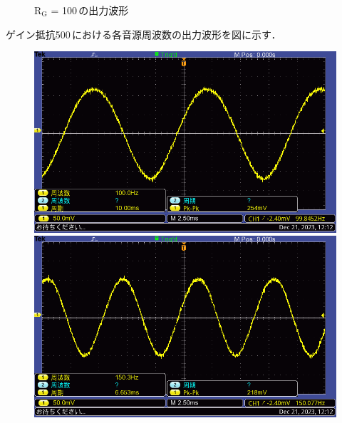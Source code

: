\documentclass{ltjsarticle}
\begin{document}
\begin{figure}[H]
\begin{minipage}{0.4\columnwidth}
			\end{minipage}
			\caption{$\mathrm{R_G}$ = 100\,\Omega の出力波形}
			\label{fig:week5-1-100}
			\end{figure}
\clearpage
			ゲイン抵抗500\,\Omega における各音源周波数の出力波形を図に示す．
			\begin{figure}[H]
			\centering
			\begin{minipage}{0.4\columnwidth}
			\centering
			\includegraphics[width = \columnwidth]{figs/F0011TEK.PNG}
			\end{minipage}
			\hspace{0.04\columnwidth}
			\begin{minipage}{0.4\columnwidth}
			\centering
			\includegraphics[width = \columnwidth]{figs/F0012TEK.PNG}
			\end{minipage}
			\hspace{0.04\columnwidth}
			\begin{minipage}{0.4\columnwidth}

\end{minipage}
\end{figure}
\end{document}
